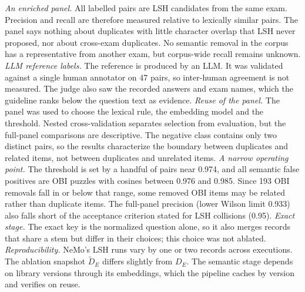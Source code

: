 \emph{An enriched panel.} All labelled pairs are LSH candidates from the same
exam. Precision and recall are therefore measured relative to lexically
similar pairs. The panel says nothing about duplicates with little character
overlap that LSH never proposed, nor about cross-exam duplicates. No
semantic removal in the corpus has a representative from another exam, but
corpus-wide recall remains unknown.
\emph{LLM reference labels.} The reference is produced by an LLM. It was
validated against a single human annotator on 47 pairs, so inter-human
agreement is not measured. The judge also saw the recorded answers and exam
names, which the guideline ranks below the question text as evidence.
\emph{Reuse of the panel.} The panel was used to choose the lexical rule, the
embedding model and the threshold. Nested cross-validation separates
selection from evaluation, but the full-panel comparisons are descriptive.
The negative class contains only two distinct pairs, so the results
characterize the boundary between duplicates and related items, not between
duplicates and unrelated items.
\emph{A narrow operating point.} The threshold is set by a handful of pairs
near 0.974, and all semantic false positives are OBI puzzles with cosines
between 0.976 and 0.985. Since 193 OBI removals fall in or below that range,
some removed OBI items may be related rather than duplicate items. The
full-panel precision (lower Wilson limit 0.933) also falls short of the
acceptance criterion stated for LSH collisions (0.95).
\emph{Exact stage.} The exact key is the normalized question alone, so it
also merges records that share a stem but differ in their choices; this
choice was not ablated.
\emph{Reproducibility.} NeMo's LSH runs vary by one or two records across
executions. The ablation snapshot $\tilde D_E$ differs slightly from $D_E$.
The semantic stage depends on library versions through its embeddings,
which the pipeline caches by version and verifies on reuse.
